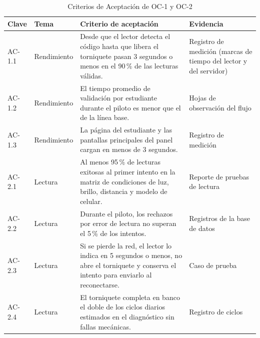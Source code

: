 \begin{table}[tbp]
	\caption{Criterios de Aceptación de OC-1 y OC-2}
	\label{tab:ac1}
	\small\setlength{\tabcolsep}{3pt}
	\begin{tabular}{P{1.2cm}P{2cm}P{7.6cm}P{4cm}}
		\toprule
		Clave & Tema & Criterio de aceptación & Evidencia \\
		\midrule
		AC-1.1 & Rendimiento & Desde que el lector detecta el código hasta que libera el torniquete pasan 3 segundos o menos en el 90\,\% de las lecturas válidas. & Registro de medición (marcas de tiempo del lector y del servidor) \\
		AC-1.2 & Rendimiento & El tiempo promedio de validación por estudiante durante el piloto es menor que el de la línea base. & Hojas de observación del flujo \\
		AC-1.3 & Rendimiento & La página del estudiante y las pantallas principales del panel cargan en menos de 3 segundos. & Registro de medición \\
		AC-2.1 & Lectura & Al menos 95\,\% de lecturas exitosas al primer intento en la matriz de condiciones de luz, brillo, distancia y modelo de celular. & Reporte de pruebas de lectura \\
		AC-2.2 & Lectura & Durante el piloto, los rechazos por error de lectura no superan el 5\,\% de los intentos. & Registros de la base de datos \\
		AC-2.3 & Lectura & Si se pierde la red, el lector lo indica en 5 segundos o menos, no abre el torniquete y conserva el intento para enviarlo al reconectarse. & Caso de prueba \\
		AC-2.4 & Lectura & El torniquete completa en banco el doble de los ciclos diarios estimados en el diagnóstico sin fallas mecánicas. & Registro de ciclos \\
		\bottomrule
	\end{tabular}
\end{table}

